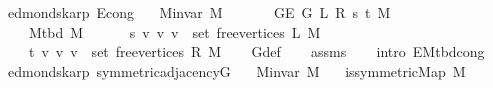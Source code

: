 \begin{isabellebody}
%
\isadelimproof
\isanewline
%
\endisadelimproof
\isanewline
{}\isamarkupfalse%
\ {\isacharparenleft}{\kern0pt}\ edmonds{\isacharunderscore}{\kern0pt}karp{\isacharparenright}{\kern0pt}\ E{}{\isacharunderscore}{\kern0pt}cong{\isacharcolon}{\kern0pt}\isanewline
\ \ \ {\isachardoublequoteopen}M{\isachardot}{\kern0pt}invar\ M{\isachardoublequoteclose}\isanewline
\ \ \isanewline
\ \ \ \ {\isachardoublequoteopen}G{\isachardot}{\kern0pt}E\ {\isacharparenleft}{\kern0pt}G{}\ L\ R\ s\ t\ M{\isacharparenright}{\kern0pt}\ {\isacharequal}{\kern0pt}\isanewline
\ \ \ \ \ M{\isacharunderscore}{\kern0pt}tbd\ M\ {\isasymunion}\isanewline
\ \ \ \ \ {\isacharbraceleft}{\kern0pt}{\isacharbraceleft}{\kern0pt}s{\isacharcomma}{\kern0pt}\ v{\isacharbraceright}{\kern0pt}\ {\isacharbar}{\kern0pt}v{\isachardot}{\kern0pt}\ v\ {\isasymin}\ set\ {\isacharparenleft}{\kern0pt}free{\isacharunderscore}{\kern0pt}vertices\ L\ M{\isacharparenright}{\kern0pt}{\isacharbraceright}{\kern0pt}\ {\isasymunion}\isanewline
\ \ \ \ \ {\isacharbraceleft}{\kern0pt}{\isacharbraceleft}{\kern0pt}t{\isacharcomma}{\kern0pt}\ v{\isacharbraceright}{\kern0pt}\ {\isacharbar}{\kern0pt}v{\isachardot}{\kern0pt}\ v\ {\isasymin}\ set\ {\isacharparenleft}{\kern0pt}free{\isacharunderscore}{\kern0pt}vertices\ R\ M{\isacharparenright}{\kern0pt}{\isacharbraceright}{\kern0pt}{\isachardoublequoteclose}\isanewline
%
\isadelimproof
\ \ %
\endisadelimproof
%
\isatagproof
{}\isamarkupfalse%
\ G{}{\isacharunderscore}{\kern0pt}def\isanewline
\ \ \isamarkupfalse%
\ assms\isanewline
\ \ \isamarkupfalse%
\ {\isacharparenleft}{\kern0pt}intro\ E{}{\isacharunderscore}{\kern0pt}{}{\isacharunderscore}{\kern0pt}M{\isacharunderscore}{\kern0pt}tbd{\isacharunderscore}{\kern0pt}cong{\isacharparenright}{\kern0pt}%
\endisatagproof
{\isafoldproof}%
%
\isadelimproof
\isanewline
%
\endisadelimproof
%
\isadeliminvisible
\isanewline
%
\endisadeliminvisible
%
\isataginvisible
{}\isamarkupfalse%
\ {\isacharparenleft}{\kern0pt}\ edmonds{\isacharunderscore}{\kern0pt}karp{\isacharparenright}{\kern0pt}\ symmetric{\isacharunderscore}{\kern0pt}adjacency{\isacharunderscore}{\kern0pt}G{}{\isacharcolon}{\kern0pt}\isanewline
\ \ \ {\isachardoublequoteopen}M{\isachardot}{\kern0pt}invar\ M{\isachardoublequoteclose}\isanewline
\ \ \ {\isachardoublequoteopen}is{\isacharunderscore}{\kern0pt}symmetric{\isacharunderscore}{\kern0pt}Map\ M{\isachardoublequoteclose}\isanewline

\end{isabellebody}
